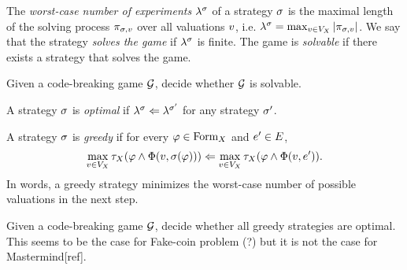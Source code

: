 The \emph{worst-case number of experiments} $\lambda^{\sigma}$
  of a strategy $\sigma$ is the maximal length of the solving process
  $\pi_{\sigma,v}$ over all valuations $v$, i.e.
  $\lambda^{\sigma} = \max_{v\in V_X} |\pi_{\sigma,v}|$.
We say that the strategy \emph{solves the game} if $\lambda^{\sigma}$ is finite.
The game is \emph{solvable} if there exists a strategy that solves the game.

\begin{problem}
Given a code-breaking game $\mathcal{G}$, decide whether $\mathcal{G}$ is solvable.
\end{problem}

\begin{definition}
A strategy $\sigma$ is \emph{optimal} if
  $\lambda^{\sigma} <= \lambda^{\sigma'}$ for any strategy $\sigma'$.

A strategy $\sigma$ is \emph{greedy} if
  for every $\varphi\in\textrm{Form}_X$ and $e'\in E$,
\[
\max_{v\in V_X} \tau_X(\varphi \wedge \Phi(v, \sigma(\varphi))) <=
\max_{v\in V_X} \tau_X(\varphi \wedge \Phi(v, e')).
\]
In words, a greedy strategy minimizes
  the worst-case number of possible valuations in the next step.
\end{definition}

\begin{problem}
Given a code-breaking game $\mathcal{G}$,
  decide whether all greedy strategies are optimal.
This seems to be the case for Fake-coin problem (?)
  but it is not the case for Mastermind[ref].
\end{problem}
